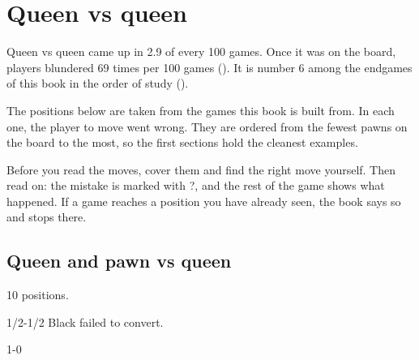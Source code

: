 \chapter{Queen vs queen}\label{ch:queen-vs-queen}
Queen vs queen came up in 2.9 of every 100 games. Once it was on the board, players blundered 69 times per 100 games (). It is number 6 among the endgames of this book in the order of study ().

The positions below are taken from the games this book is built from. In each one, the player to move went wrong. They are ordered from the fewest pawns on the board to the most, so the first sections hold the cleanest examples.

Before you read the moves, cover them and find the right move yourself. Then read on: the mistake is marked with ?, and the rest of the game shows what happened. If a game reaches a position you have already seen, the book says so and stops there.


\section{Queen and pawn vs queen}
10 positions.


1/2-1/2 Black failed to convert.\par
{}

1-0\par
{}


